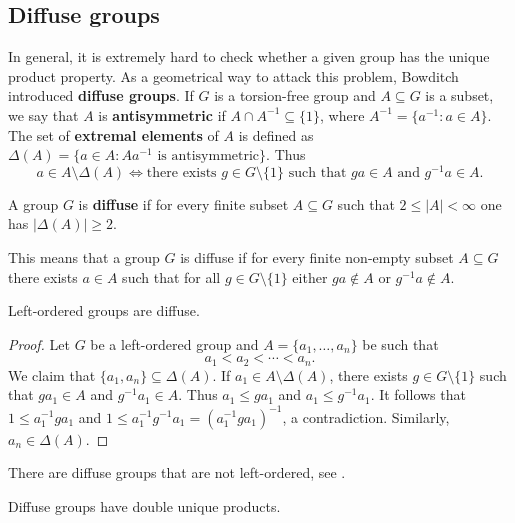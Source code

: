 \begin{optional}
\section{Diffuse groups}

In general, it is extremely hard to check whether a given group
has the unique product property. As a geometrical way to 
attack this problem, Bowditch introduced \textbf{diffuse groups}. If
$G$ is a torsion-free group and 
$A\subseteq G$ is a subset, we say that $A$ is \textbf{antisymmetric}  
if $A\cap A^{-1}\subseteq\{1\}$, where $A^{-1}=\{a^{-1}:a\in
A\}$. The set of \textbf{extremal elements} of $A$ is defined as 
$\Delta(A)=\{a\in A:Aa^{-1}\text{ is antisymmetric}\}$. 
Thus 
\[
	a\in A\setminus\Delta(A)
	\Longleftrightarrow
	\text{there exists $g\in G\setminus\{1\}$ such that $ga\in A$ and $g^{-1}a\in A$}.
\]

\begin{definition}
	A group $G$ is \textbf{diffuse} if for every finite subset $A\subseteq
	G$ such that $2\leq |A|<\infty$ one has $|\Delta(A)|\geq2$.
\end{definition}

This means that a group $G$ is diffuse if for every finite non-empty subset $A\subseteq G$ there exists 
$a\in A$ such that for all $g\in G\setminus\{1\}$ either $ga\not\in A$ or $g^{-1}a\not\in A$. 

\begin{proposition}
	Left-ordered groups are diffuse.	
\end{proposition}

\begin{proof}
    Let $G$ be a left-ordered group and $A=\{a_1,\dots,a_n\}$ be such that
    \[
    a_1<a_2<\cdots<a_n.
    \]
    We claim that 
	$\{a_1,a_n\}\subseteq\Delta(A)$. If $a_1\in
	A\setminus\Delta(A)$, there exists $g\in G\setminus\{1\}$ such that $ga_1\in A$ and
	$g^{-1}a_1\in A$. Thus  $a_1\leq ga_1$ and $a_1\leq g^{-1}a_1$. It follows that
	$1\leq a_1^{-1}ga_1$ and $1\leq a_1^{-1}g^{-1}a_1=(a_1^{-1}ga_1)^{-1}$, 
	a contradiction. Similarly, $a_n\in \Delta(A)$.
\end{proof}

There are diffuse groups that are not left-ordered, see
\cite{MR3548136}. 

\begin{proposition}
	\label{pro:difuso=>2up}
    Diffuse groups have double unique products.  
\end{proposition}


\end{optional}
